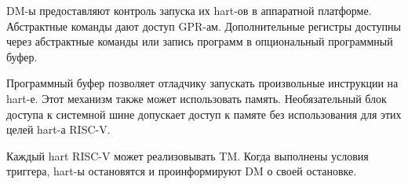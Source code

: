 DM-ы предоставляют контроль запуска их hart-ов в аппаратной платформе. Абстрактные команды
дают доступ GPR-ам. Дополнительные регистры доступны через абстрактные команды или запись
программ в опциональный программный буфер.

Программный буфер позволяет отладчику запускать произвольные инструкции на
hart-е. Этот механизм также может использовать память. Необязательный блок доступа
к системной шине допускает доступ к памяте без использования для этих целей hart-а RISC-V.

Каждый hart RISC-V может реализовывать TM. Когда выполнены условия триггера,
hart-ы остановятся и проинформируют DM о своей остановке.
